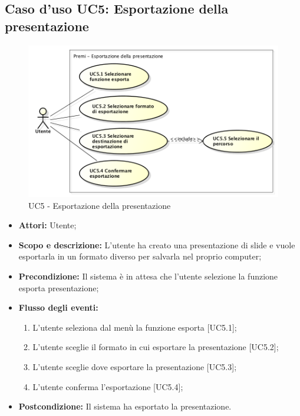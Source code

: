 \subsection{Caso d'uso UC5: Esportazione della presentazione}
	\begin{figure}[h] 
		\centering 
		\includegraphics[scale=0.45] {img/UC5.png} 
		\caption{UC5 - Esportazione della presentazione} 
	\end{figure}
	
	\begin{itemize}
		\item \textbf{Attori:} Utente;
		\item \textbf{Scopo e descrizione:} L'utente ha creato una presentazione di slide e vuole esportarla in un formato diverso per salvarla nel proprio computer;
		\item \textbf{Precondizione:} Il sistema è in attesa che l'utente selezione la funzione esporta presentazione;
		\item \textbf{Flusso degli eventi:}
		\begin{enumerate}
			\item L'utente seleziona dal menù la funzione esporta [UC5.1];
			\item L'utente sceglie il formato in cui esportare la presentazione [UC5.2];
			\item L'utente sceglie dove esportare la presentazione [UC5.3];
			\item L'utente conferma l'esportazione [UC5.4];
		\end{enumerate}
		\item \textbf{Postcondizione:} Il sistema ha esportato la presentazione.
	\end{itemize}


